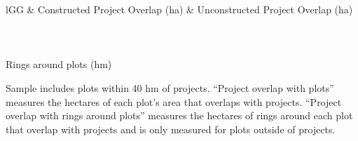 \documentclass[12pt]{article}
\begin{document}
\begin{table}
\small
\centering
\caption{Spatial Exposure Summary Statistics}\label{table:spatialsummary}
\vspace{-2mm}
\begin{threeparttable}
\begin{tabular}{lGG}
\toprule
& Constructed Project Overlap (ha) & Unconstructed  Project Overlap (ha) \\
\midrule
\\[-.5em]
\\[-.7em]

\\[-.5em]
\hspace{2em}Rings around plots (hm)   \\

% 
% 
\bottomrule
\end{tabular}
\begin{tablenotes}
\item \footnotesize Sample includes plots within 40 hm of projects.  ``Project overlap with plots'' measures the hectares of each plot's area that overlaps with projects.  ``Project overlap with rings around plots'' measures the hectares of rings around each plot that overlap with projects and is only measured for plots outside of projects.
\end{tablenotes}
\end{threeparttable}
\end{table}
\end{document}
